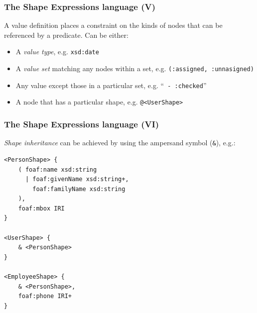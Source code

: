 \documentclass{beamer}
\begin{document}
\begin{frame}[fragile]
  \frametitle{The Shape Expressions language (V)}

  A value definition places a constraint on the kinds of nodes that can
    be referenced by a predicate. Can be either:

  \begin{itemize}
    \item A \textit{value type}, e.g. \texttt{xsd:date}

    \pause

    \item A \textit{value set} matching any nodes within a set, e.g.
      \texttt{(:assigned, :unnasigned)}

    \pause

    \item Any value except those in a particular set, e.g.  ``\texttt{ -
      :checked}''

    \pause

    \item A node that has a particular shape, e.g. \texttt{@<UserShape>}
  \end{itemize}
\end{frame}

\begin{frame}[fragile]
  \frametitle{The Shape Expressions language (VI)}

  \textit{Shape inheritance} can be achieved by using the ampersand symbol
  (\texttt{\&}), e.g.:

  \begin{Verbatim}[fontsize=\scriptsize]
<PersonShape> {
    ( foaf:name xsd:string
      | foaf:givenName xsd:string+,
        foaf:familyName xsd:string
    ),
    foaf:mbox IRI
}

<UserShape> {
    & <PersonShape>
}

<EmployeeShape> {
    & <PersonShape>,
    foaf:phone IRI+
}
  \end{Verbatim}
\end{frame}
\end{document}
